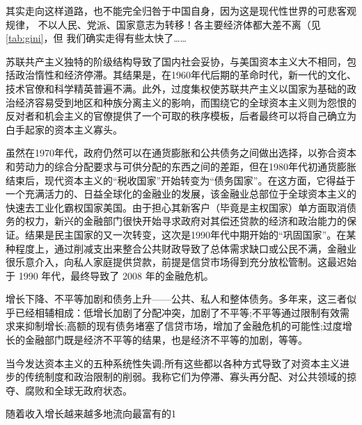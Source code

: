 其实走向这样道路，也不能完全归咎于中国自身，因为这是现代性世界的可悲客观规律，
不以人民、党派、国家意志为转移！各主要经济体都大差不离（见\cref{tab:gini}，但
我们确实走得有些太快了……





苏联共产主义独特的阶级结构导致了国内社会妥协，与美国资本主义大不相同，包括政治惰性和经济停滞。其结果是，在1960年代后期的革命时代，新一代的文化、技术官僚和科学精英普遍不满。此外，过度集权使苏联共产主义以国家为基础的政治经济容易受到地区和种族分离主义的影响，而围绕它的全球资本主义则为怨恨的反对者和机会主义的官僚提供了一个可取的秩序模板，后者最终可以将自己确立为白手起家的资本主义寡头。

虽然在1970年代，政府仍然可以在通货膨胀和公共债务之间做出选择，以弥合资本和劳动力的综合分配要求与可供分配的东西之间的差距，但在1980年代初通货膨胀结束后，现代资本主义的“税收国家”开始转变为“债务国家”。在这方面，它得益于一个充满活力的、日益全球化的金融业的发展，该金融业总部位于全球资本主义的快速去工业化霸权国家美国。由于担心其新客户（毕竟是主权国家）单方面取消债务的权力，新兴的金融部门很快开始寻求政府对其偿还贷款的经济和政治能力的保证。结果是民主国家的又一次转变，这次是1990年代中期开始的“巩固国家”。在某种程度上，通过削减支出来整合公共财政导致了总体需求缺口或公民不满，金融业很乐意介入，向私人家庭提供贷款，前提是信贷市场得到充分放松管制。这最迟始于 1990 年代，最终导致了 2008 年的金融危机。

增长下降、不平等加剧和债务上升——公共、私人和整体债务。多年来，这三者似乎已经相辅相成：低增长加剧了分配冲突，加剧了不平等;不平等通过限制有效需求来抑制增长;高额的现有债务堵塞了信贷市场，增加了金融危机的可能性;过度增长的金融部门既是经济不平等的结果，也是经济不平等的加剧，等等。

当今发达资本主义的五种系统性失调;所有这些都以各种方式导致了对资本主义进步的传统制度和政治限制的削弱。我称它们为停滞、寡头再分配、对公共领域的掠夺、腐败和全球无政府状态。


随着收入增长越来越多地流向最富有的1%

